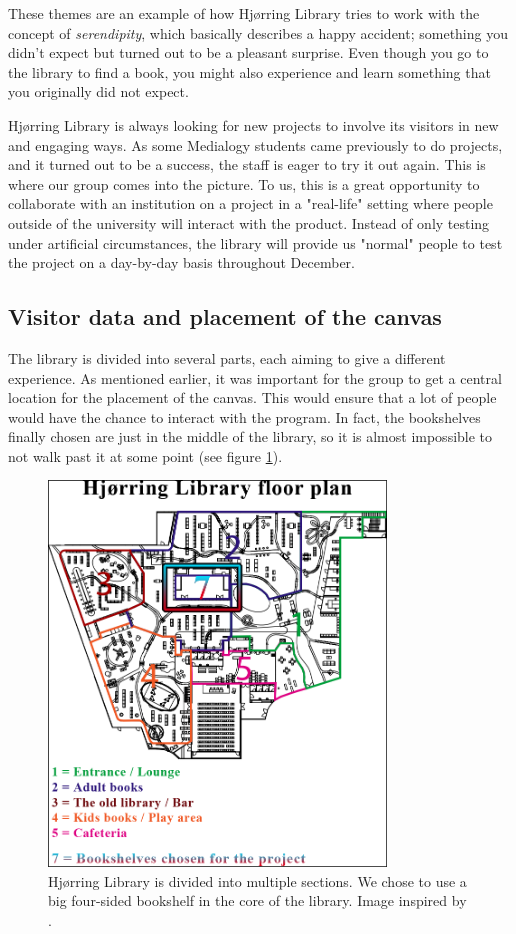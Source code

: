 These themes are an example of how Hj{\o}rring Library tries to work with the concept of \textit{serendipity}, which basically describes a happy accident; something you didn't expect but turned out to be a pleasant surprise. Even though you go to the library to find a book, you might also experience and learn something that you originally did not expect.

Hj{\o}rring Library is always looking for new projects to involve its visitors in new and engaging ways. As some Medialogy students came previously to do projects, and it turned out to be a success, the staff is eager to try it out again. This is where our group comes into the picture. To us, this is a great opportunity to collaborate with an institution on a project in a "real-life" setting where people outside of the university will interact with the product. Instead of only testing under artificial circumstances, the library will provide us "normal" people to test the project on a day-by-day basis throughout December.

\subsection{Visitor data and placement of the canvas}
The library is divided into several parts, each aiming to give a different experience. As mentioned earlier, it was important for the group to get a central location for the placement of the canvas. This would ensure that a lot of people would have the chance to interact with the program. In fact, the bookshelves finally chosen are just in the middle of the library, so it is almost impossible to not walk past it at some point (see figure \ref{fig:library_floorplans}).

\begin{figure}[htbp]
\centering
\includegraphics[width=0.80\textwidth]{Pictures/HjoerringLibrary/hjoerring_library_floorplans.png}
\caption{Hj{\o}rring Library is divided into multiple sections. We chose to use a big four-sided bookshelf in the core of the library. Image inspired by \citep{hjoerring_study}.}
\label{fig:library_floorplans}
\end{figure}

